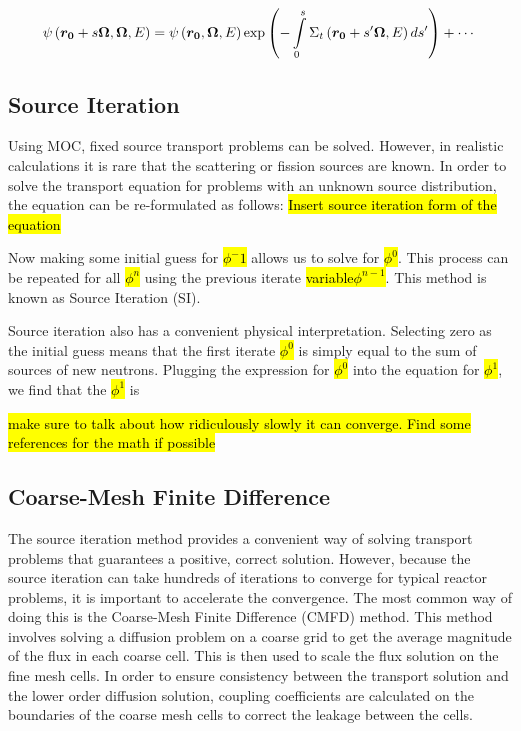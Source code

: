 {\begin{dmath}\label{e:MOCflatsource}
\psi\left(\bm {r_0} + s\bm\Omega,\bm\Omega,E\right) = \psi\left(\bm {r_0},\bm\Omega,E\right)\exp{\left(-\intop_0^s \Sigma_t\left(\bm {r_0} + s'\bm\Omega,E\right)ds'\right)} + \cdots
\end{dmath}

\subsection{Source Iteration}

Using MOC, fixed source transport problems can be solved.  However, in realistic calculations it is rare that the scattering or fission sources are known.  In order to solve the transport equation for problems with an unknown source distribution, the equation can be re-formulated as follows:
\hl{Insert source iteration form of the equation}

Now making some initial guess for \hl{$\phi^-1$} allows us to solve for \hl{$\phi^0$}.  This process can be repeated for all \hl{$\phi^n$} using the previous iterate \hl{variable$\phi^{n-1}$}.  This method is known as Source Iteration (SI).

Source iteration also has a convenient physical interpretation.  Selecting zero as the initial guess means that the first iterate \hl{$\phi^0$} is simply equal to the sum of sources of new neutrons.  Plugging the expression for \hl{$\phi^0$} into the equation for \hl{$\phi^1$}, we find that the \hl{$\phi^1$} is 

\hl{make sure to talk about how ridiculously slowly it can converge.  Find some references for the math if possible}}{}

\subsection{Coarse-Mesh Finite Difference}\label{ss:CMFD}

The source iteration method provides a convenient way of solving transport problems that guarantees a positive, correct solution.  However, because the source iteration can take hundreds of iterations to converge for typical reactor problems, it is important to accelerate the convergence.  The most common way of doing this is the Coarse-Mesh Finite Difference (CMFD) method.  This method involves solving a diffusion problem on a coarse grid to get the average magnitude of the flux in each coarse cell.  This is then used to scale the flux solution on the fine mesh cells.  In order to ensure consistency between the transport solution and the lower order diffusion solution, coupling coefficients are calculated on the boundaries of the coarse mesh cells to correct the leakage between the cells.

